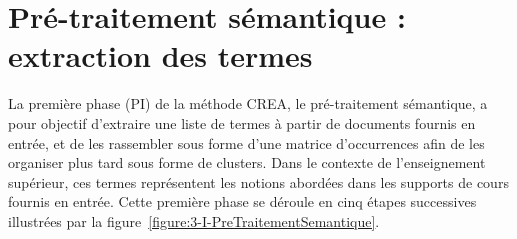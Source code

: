 



\clearpage %
\newpage   %


\section{Pré-traitement sémantique : extraction des termes}
\label{section:CREA:PI-AnalyseSemantique}

La première phase (PI) de la méthode CREA, le pré-traitement sémantique, a pour objectif d'extraire une liste de termes à partir de documents fournis en entrée, et de les rassembler sous forme d'une matrice d'occurrences afin de les organiser plus tard sous forme de clusters.
Dans le contexte de l'enseignement supérieur, ces termes représentent les notions abordées dans les supports de cours fournis en entrée.
Cette première phase se déroule en cinq étapes successives illustrées par la figure~\ref{figure:3-I-PreTraitementSemantique}.

